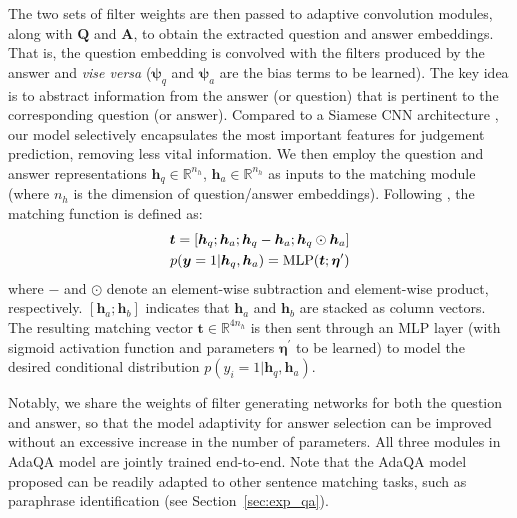 \documentclass[11pt,a4paper]{article}
\begin{document}
The two sets of filter weights are then passed to adaptive convolution modules, along with $\boldsymbol{Q}$ and $\boldsymbol{A}$, to obtain the extracted question and answer embeddings.
That is, the question embedding is convolved with the filters produced by the answer and \emph{vise versa} ($\boldsymbol{\psi}_q$ and $\boldsymbol{\psi}_a$ are the bias terms to be learned). The key idea is to abstract information from the answer (or question) that is pertinent to the corresponding question (or answer). Compared to a Siamese CNN architecture \citep{bromley1994signature}, our model selectively encapsulates the most important features for judgement prediction, removing less vital information. We then employ the question and answer representations $\boldsymbol{h}_q \in \mathbb{R}^{n_h}$, $\boldsymbol{h}_a \in \mathbb{R}^{n_h}$ as inputs to the matching module (where $n_h$ is the dimension of question/answer embeddings).
Following \citet{mou2015natural}, the matching function is defined as:
\begin{align}
\boldsymbol{t} = [\boldsymbol{h}_q; \boldsymbol{h}_a; \boldsymbol{h}_q - \boldsymbol{h}_a; \boldsymbol{h}_q \odot \boldsymbol{h}_a] \\
p(\boldsymbol{y}=1 | \boldsymbol{h}_q, \boldsymbol{h}_a) = \textbf{\normalfont{MLP}}(\boldsymbol{t}; \boldsymbol{\eta}^{\prime})
\label{eq:predict}
\end{align}
where $ - $ and $\odot$ denote an element-wise subtraction and element-wise product, respectively. $[\boldsymbol{h}_a ; \boldsymbol{h}_b]$ indicates that $\boldsymbol{h}_a$ and $\boldsymbol{h}_b$ are stacked as column vectors. The resulting matching vector $\boldsymbol{t} \in \mathbb{R}^{4n_h}$ is then sent through an MLP layer (with sigmoid activation function and parameters $\boldsymbol{\eta}^{\prime}$ to be learned) to model the desired conditional distribution $p(y_i=1 | \boldsymbol{h}_q, \boldsymbol{h}_a)$.


Notably, we share the weights of filter generating networks for both the question and answer, so that the model adaptivity for answer selection can be improved without an excessive increase in the number of parameters. All three modules in AdaQA model are jointly trained end-to-end. Note that the AdaQA model proposed can be readily adapted to other sentence matching tasks, such as paraphrase identification (see Section~\ref{sec:exp_qa}).
\end{document}
